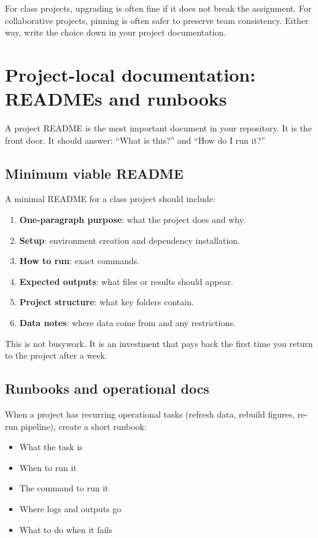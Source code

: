 For class projects, upgrading is often fine if it does not break the assignment. For collaborative projects, pinning is often safer to preserve team consistency. Either way, write the choice down in your project documentation.

\section{Project-local documentation: READMEs and runbooks}
A project README is the most important document in your repository. It is the front door. It should answer: “What is this?” and “How do I run it?”

\subsection{Minimum viable README}
A minimal README for a class project should include:
\begin{enumerate}[noitemsep]
  \item \textbf{One-paragraph purpose}: what the project does and why.
  \item \textbf{Setup}: environment creation and dependency installation.
  \item \textbf{How to run}: exact commands.
  \item \textbf{Expected outputs}: what files or results should appear.
  \item \textbf{Project structure}: what key folders contain.
  \item \textbf{Data notes}: where data come from and any restrictions.
\end{enumerate}

This is not busywork. It is an investment that pays back the first time you return to the project after a week.

\subsection{Runbooks and operational docs}
When a project has recurring operational tasks (refresh data, rebuild figures, re-run pipeline), create a short runbook:
\begin{itemize}[noitemsep]
  \item What the task is
  \item When to run it
  \item The command to run it
  \item Where logs and outputs go
  \item What to do when it fails
\end{itemize}

